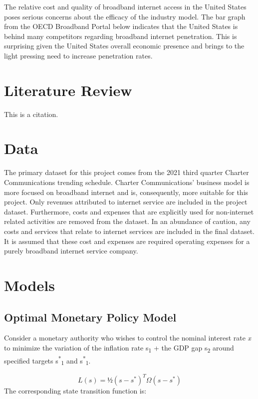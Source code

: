 \documentclass[a4paper,oneside]{article}
\begin{document}
The relative cost and quality of broadband internet access in the United States poses
serious concerns about the efficacy of the industry model. The bar graph from the OECD
Broadband Portal below indicates that the United States is behind many competitors regarding
broadband internet penetration. This is surprising given the United States overall economic
presence and brings to the light pressing need to increase penetration rates.

\section{Literature Review}

\citep{Dixit_1989} This is a citation.

\section{Data}

The primary dataset for this project comes from the 2021 third quarter Charter Communications trending schedule. \citep{chtr_rep} 
Charter Communications' business model is more focused on broadband internet and is, consequently, more suitable for this project.
Only revenues attributed to internet service are included in the project dataset. 
Furthermore, costs and expenses that are explicitly used for non-internet related activities are removed from the dataset.
In an abundance of caution, any costs and services that relate to internet services are included in the final dataset. 
It is assumed that these cost and expenses are required operating expenses for a purely broadband internet service company.

\section{Models}
\subsection{Optimal Monetary Policy Model}

\:\:\:\:\:\:\:\:Consider a monetary authority who wishes to control the nominal interest rate  \emph{x} to minimize the variation of the inflation rate s\textsubscript{1} + the GDP gap s\textsubscript{2} around specified targets s\textsuperscript{*}\textsubscript{1} and s\textsuperscript{*}\textsubscript{1}.

\begin{equation}
	L(s) = ½(s-s^{*})^{T}\Omega(s-s^{*})
	\label{eq:mye1}
\end{equation} 
The corresponding state transition function is: 
\end{document}
